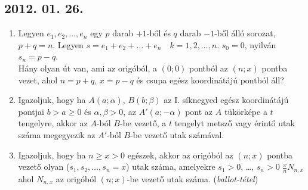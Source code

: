\subsection*{2012. 01. 26.}
\begin{enumerate}
\item
Legyen $e_{1}, e_{2},\ldots, e_{n}$ egy $p$ darab $+1$-ből és $q$ darab $-1$-ből álló sorozat, $p+q=n$. Legyen $s=e_{1}+e_{2}+{\ldots}+e_{n}\quad k=1, 2, \ldots, n$. $s_{0}=0$, nyilván $s_{n}=p-q$. \\
Hány olyan út van, ami az origóból, a $(0;0)$ pontból az $(n;x)$ pontba vezet, ahol $n=p+q$, $x=p-q$ és csupa egész koordinátájú pontból áll?
\item
Igazoljuk, hogy ha $A(a;\alpha)$, $B(b;\beta)$ az I. síknegyed egész koordinátájú pontjai $b>a\ge0$ és $\alpha,\beta>0$, az $A'(a;-\alpha)$ pont az $A$ tükörképe a $t$ tengelyre, akkor az $A$-ból $B$-be vezető, a $t$ tengelyt metsző vagy érintő utak száma megegyezik az $A'$-ből $B$-be vezető utak számával. 
\item
Igazoljuk, hogy ha $n\ge x>0$ egészek, akkor az origóból az $(n;x)$ pontba vezető olyan ($s_{1}, s_{2}, {\ldots}, s_{n}=x$) utak száma, amelyekre $s_{1}>0$, {\ldots}, $s_{n}>0$ $\frac{x}{n} N_{n,x}$ ahol $N_{n,x}$ az origóból $(n;x)$-be vezető utak száma. (\textit{ballot-tétel})
\end{enumerate}



